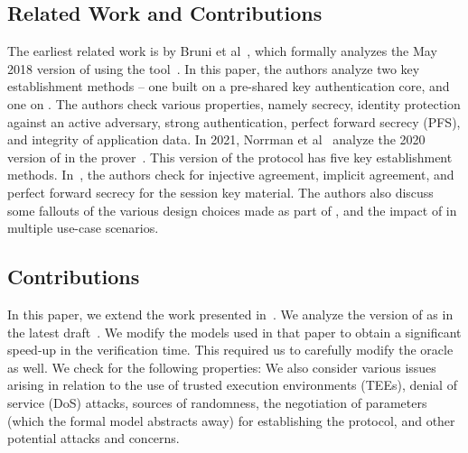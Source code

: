 \subsection{Related Work and Contributions}
\label{sub:related}
The earliest related work is by Bruni et al~\cite{DBLP:conf/secsr/BruniJPS18}, which formally analyzes the May 2018 version of \mEdhoc{} using the \mProverif{} tool~\cite{DBLP:conf/csfw/Blanchet01}. 
%
In this paper, the authors analyze two key establishment methods -- one built on a pre-shared key authentication core, and one on \mSigma{}. 
%
The authors check  various properties, namely secrecy, identity protection against an active adversary, strong authentication, perfect forward secrecy (PFS), and integrity of application data. 
%
In 2021, Norrman et al~\cite{Norr21} analyze the 2020 version of \mEdhoc{} in the \mTamarin{} prover~\cite{DBLP:conf/cav/MeierSCB13}. 
%
This version of the protocol has five key establishment methods. 
%
In~\cite{Norr21}, the authors check for injective agreement, implicit agreement, and perfect forward secrecy for the session key material. 
%
The authors also discuss some fallouts of the various design choices made as part of \mEdhoc{}, and the impact of \mEdhoc{} in multiple use-case scenarios.
%
%

\subsection{Contributions}
\label{sec:contributions}
In this paper, we extend the work presented in~\cite{Norr21}. 
%
We analyze the version of \mEdhoc{} as in the latest draft~\cite{}.
%
We modify the \mTamarin{} models used in that paper to obtain a significant speed-up in the verification time.
%
This required us to carefully modify the oracle as well.
%
We check for the following properties: 
%
We also consider various issues arising in relation to the use of trusted execution environments (TEEs), denial of service (DoS) attacks, sources of randomness, the negotiation of parameters (which the formal model abstracts away) for establishing the protocol, and other potential attacks and concerns.
%



